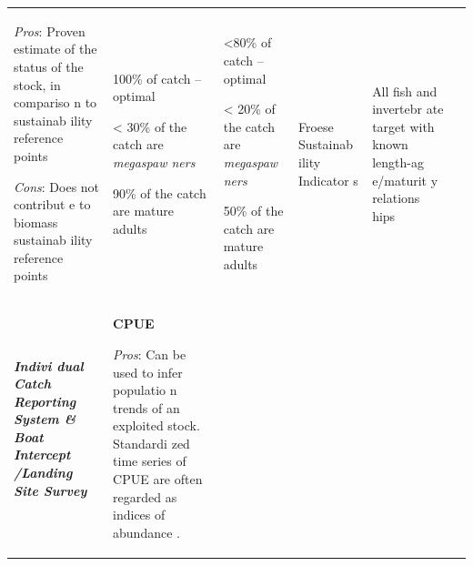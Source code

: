 \documentclass[]{book}
\begin{document}
\begin{longtable}[]{@{}llllll@{}}
\begin{minipage}[t]{0.16\columnwidth}
\emph{Pros}: Proven estimate of the status of the stock, in compariso n
to sustainab ility reference points

\emph{Cons}: Does not contribut e to biomass sustainab ility reference
points\strut
\end{minipage} & \begin{minipage}[t]{0.16\columnwidth}\raggedright\strut
100\% of catch -- optimal

\textless{} 30\% of the catch are \emph{megaspaw ners}

90\% of the catch are mature adults\strut
\end{minipage} & \begin{minipage}[t]{0.16\columnwidth}\raggedright\strut
\textless{}80\% of catch -- optimal

\textless{} 20\% of the catch are \emph{megaspaw ners}

50\% of the catch are mature adults\strut
\end{minipage} & \begin{minipage}[t]{0.16\columnwidth}\raggedright\strut
Froese Sustainab ility Indicator s\strut
\end{minipage} & \begin{minipage}[t]{0.16\columnwidth}\raggedright\strut
All fish and invertebr ate target with known length-ag e/maturit y
relations hips\strut
\end{minipage}\tabularnewline
\begin{minipage}[t]{0.16\columnwidth}\raggedright\strut
\textbf{\emph{Indivi dual Catch Reporting System \& Boat Intercept
/Landing Site Survey}}\strut
\end{minipage} & \begin{minipage}[t]{0.16\columnwidth}\raggedright\strut
\textbf{CPUE}

\emph{Pros}: Can be used to infer populatio n trends of an exploited
stock. Standardi zed time series of CPUE are often regarded as indices
of abundance .


\end{minipage}
\end{longtable}
\end{document}
